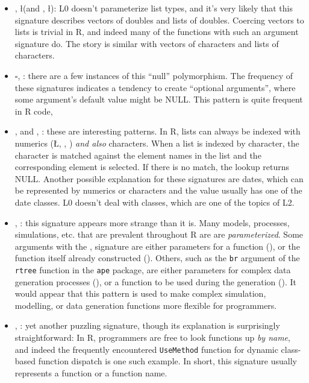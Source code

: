 \documentclass[acmsmall,10pt,review,anonymous]{acmart}\settopmatter{printfolios=true,printccs=false,printacmref=false}
\begin{document}
\begin{itemize}

	\item \D, \l (and \C, \l): L0 doesn't parameterize list types, and it's very likely that this signature describes vectors of doubles and lists of doubles.
	Coercing vectors to lists is trivial in R, and indeed many of the functions with such an argument signature do.
	The story is similar with vectors of characters and lists of characters.
	
	\item $\square$, \sN: there are a few instances of this ``null'' polymorphism.
	The frequency of these signatures indicates a tendency to create ``optional arguments'', where some argument's default value might be NULL.
	This pattern is quite frequent in R code, 

	\item \C, \D and \C, \I: these are interesting patterns.
	In R, lists can always be indexed with numerics (\L, \D, \I) {\it and also} characters.
	When a list is indexed by character, the character is matched against the element names in the list and the corresponding element is selected.
	If there is no match, the lookup returns NULL.
	Another possible explanation for these signatures are dates, which can be represented by numerics or characters and the value usually has one of the date classes.
	L0 doesn't deal with classes, which are one of the topics of L2.

	\item \D, \sF: this signature appears more strange than it is.
	Many models, processes, simulations, etc. that are prevalent throughout R are are {\it parameterized}.
	Some arguments with the \D, \sF signature are either parameters for a function (\D), or the function itself already constructed (\sF).
	Others, such as the {\tt br} argument of the {\tt rtree} function in the {\tt ape} package, are either parameters for complex data generation processes (\D), or a function to be used during the generation (\sF).
	It would appear that this pattern is used to make complex simulation, modelling, or data generation functions more flexible for programmers.
	
	\item \C, \sF: yet another puzzling signature, though its explanation is surprisingly straightforward:
	In R, programmers are free to look functions up {\it by name}, and indeed the frequently encountered {\tt UseMethod} function for dynamic class-based function dispatch is one such example.
	In short, this signature usually represents a function or a function name.

\end{itemize}
\end{document}
